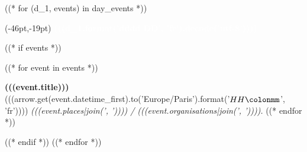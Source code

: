 \documentclass[a4paper,landscape,12pt]{article}
\newcommand{\carre}[1]{\colorbox{festif}{\textcolor{festif}{\texttt{O}}}}
\newcommand{\evenement}[4]{\textbf{#1}\\{#2 }\textit{#3 / #4.}}
\begin{document}
\pagestyle{empty}

((* for (d_1, events) in day_events *))

\begin{textblock*}{200pt}(-46pt,-19pt)
\fontsize{65}{65}\selectfont
\textcolor{white}{\textbf{(((d_1.format('dddd DD', 'fr').decode('utf-8'))))}}
\end{textblock*}
\vfill
\fontsize{32}{32}\selectfont
((* if events *))
\begin{description}
((* for event in events *))
	\item[\carre{(((event.type)))}] \evenement{(((event.title)))}{(((arrow.get(event.datetime_first).to('Europe/Paris').format('$HH\colonmm$', 'fr'))))}{(((event.places|join(', '))))}{(((event.organisations|join(', '))))}
((* endfor *))
\end{description}
((* endif *))
\vfill
\pagebreak
((* endfor *))
\end{document}
